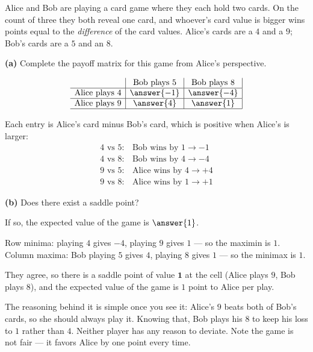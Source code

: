 \documentclass[12pt]{ximera}
\begin{document}
\begin{problem}
Alice and Bob are playing a card game where they each hold two cards. On the count of
three they both reveal one card, and whoever's card value is bigger wins points equal to
the \emph{difference} of the card values. Alice's cards are a $4$ and a $9$; Bob's cards
are a $5$ and an $8$.

\begin{prompt}
\textbf{(a)} Complete the payoff matrix for this game from Alice's perspective.

\[
\begin{array}{c|c|c|}
\phantom{|} & \text{Bob plays } 5 & \text{Bob plays } 8 \\\hline
\text{Alice plays } 4 & \answer{-1} & \answer{-4} \\\hline
\text{Alice plays } 9 & \answer{4} & \answer{1} \\\hline
\end{array}
\]

\begin{feedback}
Each entry is Alice's card minus Bob's card, which is positive when Alice's is larger:
\[
\begin{array}{ll}
4 \text{ vs } 5: & \text{Bob wins by } 1 \to -1\\
4 \text{ vs } 8: & \text{Bob wins by } 4 \to -4\\
9 \text{ vs } 5: & \text{Alice wins by } 4 \to +4\\
9 \text{ vs } 8: & \text{Alice wins by } 1 \to +1
\end{array}
\]
\end{feedback}
\end{prompt}

\begin{prompt}
\textbf{(b)} Does there exist a saddle point?

\begin{multipleChoice}
\end{multipleChoice}

If so, the expected value of the game is $\answer{1}$.

\begin{feedback}
Row minima: playing $4$ gives $-4$, playing $9$ gives $1$ --- so the maximin is $1$.
Column maxima: Bob playing $5$ gives $4$, playing $8$ gives $1$ --- so the minimax is
$1$.

They agree, so there is a saddle point of value $\mathbf{1}$ at the cell
(Alice plays $9$, Bob plays $8$), and the expected value of the game is $1$ point to
Alice per play.

The reasoning behind it is simple once you see it: Alice's $9$ beats both of Bob's
cards, so she should always play it. Knowing that, Bob plays his $8$ to keep his loss
to $1$ rather than $4$. Neither player has any reason to deviate. Note the game is not
fair --- it favors Alice by one point every time.
\end{feedback}
\end{prompt}
\end{problem}
\end{document}
